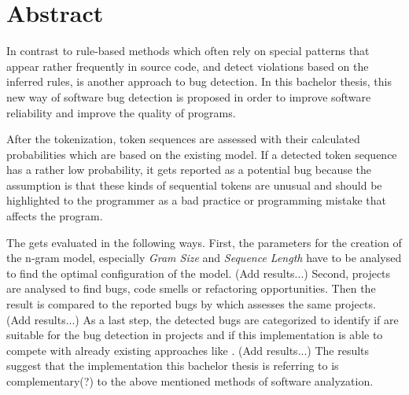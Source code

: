 \chapter*{Abstract}

In contrast to rule-based methods which often rely on special patterns that appear rather frequently in source code, and detect violations based on the inferred rules, \ngram{} is another approach to bug detection. In this bachelor thesis, this new way of software bug detection is proposed in order to improve software reliability and improve the quality of \scratch{} programs.

After the tokenization, token sequences are assessed with their calculated probabilities which are based on the existing model. If a detected token sequence has a rather low probability, it gets reported as a potential bug because the assumption is that these kinds of sequential tokens are unusual and should be highlighted to the programmer as a bad practice or programming mistake that affects the program.

The \ngram{} gets evaluated in the following ways. First, the parameters for the creation of the n-gram model, especially \textit{Gram Size} and \textit{Sequence Length} have to be analysed to find the optimal configuration of the model. (Add results...) Second, \scratch{} projects are analysed to find bugs, code smells or refactoring opportunities. Then the result is compared to the reported bugs by \litterbox{} which assesses the same projects. (Add results...) As a last step, the detected bugs are categorized to identify if  are suitable for the bug detection in \scratch{} projects and if this implementation is able to compete with already existing approaches like \litterbox{}. (Add results...) The results suggest that the implementation this bachelor thesis is referring to is complementary(?) to the above mentioned methods of software analyzation.
 